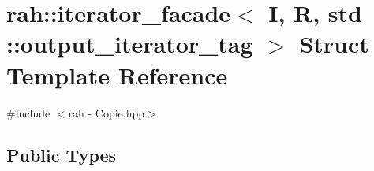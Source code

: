 \hypertarget{structrah_1_1iterator__facade_3_01_i_00_01_r_00_01std_01_1_1output__iterator__tag_01_4}{}\section{rah\+::iterator\+\_\+facade$<$ I, R, std \+::output\+\_\+iterator\+\_\+tag $>$ Struct Template Reference}
\label{structrah_1_1iterator__facade_3_01_i_00_01_r_00_01std_01_1_1output__iterator__tag_01_4}


{\ttfamily \#include $<$rah -\/ Copie.\+hpp$>$}

\subsection*{Public Types}
